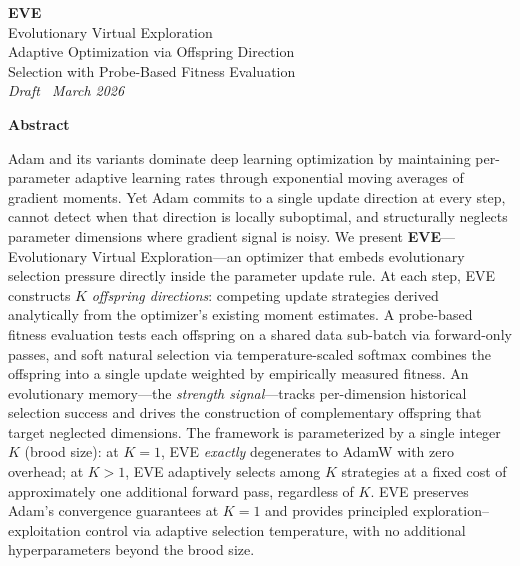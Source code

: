 \documentclass[12pt]{article}
\begin{document}
\begin{center}
  {\color{accent}\LARGE\bfseries EVE}\\[6pt]
  {\color{accent2}\Large Evolutionary Virtual Exploration}\\[8pt]
  {\large Adaptive Optimization via Offspring Direction\\[2pt]
  Selection with Probe-Based Fitness Evaluation}\\[14pt]
  {\normalsize\color{graytext}\itshape Draft \textemdash\
  March 2026}\\[6pt]
\end{center}

\noindent{\color{rulecol}\rule{\linewidth}{1.2pt}}

\begin{center}
  {\bfseries Abstract}
\end{center}
\noindent
Adam and its variants dominate deep learning optimization by maintaining
per-parameter adaptive learning rates through exponential moving averages
of gradient moments.
Yet Adam commits to a single update direction at every step, cannot detect
when that direction is locally suboptimal, and structurally neglects
parameter dimensions where gradient signal is noisy.
We present \textbf{EVE}---Evolutionary Virtual Exploration---an optimizer
that embeds evolutionary selection pressure directly inside the parameter
update rule.
At each step, EVE constructs $K$ \emph{offspring directions}: competing
update strategies derived analytically from the optimizer's existing
moment estimates.
A probe-based fitness evaluation tests each offspring on a shared data
sub-batch via forward-only passes, and soft natural selection via
temperature-scaled softmax combines the offspring into a single update
weighted by empirically measured fitness.
An evolutionary memory---the \emph{strength signal}---tracks per-dimension
historical selection success and drives the construction of complementary
offspring that target neglected dimensions.
The framework is parameterized by a single integer $K$ (brood size):
at $K=1$, EVE \emph{exactly} degenerates to AdamW with zero overhead;
at $K>1$, EVE adaptively selects among $K$ strategies at a fixed cost of
approximately one additional forward pass, regardless of $K$.
EVE preserves Adam's convergence guarantees at $K=1$ and provides
principled exploration--exploitation control via adaptive selection
temperature, with no additional hyperparameters beyond the brood size.
\end{document}
